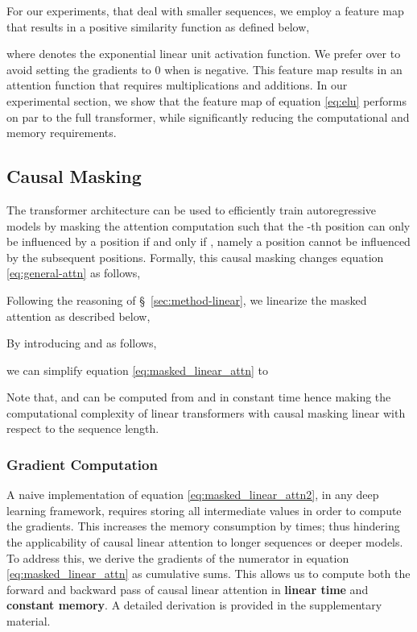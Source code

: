 \documentclass{article}
\begin{document}
For our experiments, that deal with smaller sequences, we employ a feature map
that results in a positive similarity function as defined below,

where  denotes the exponential linear unit
\cite{clevert2015fast} activation function. We prefer  over
 to avoid setting the gradients to 0 when  is negative.
This feature map results in an attention function that requires 
multiplications and additions. In our experimental section, we show that the
feature map of equation \ref{eq:elu} performs on par to the full transformer,
while significantly reducing the computational and memory requirements.

\subsection{Causal Masking} \label{sec:method-masking}

The transformer architecture can be used to efficiently train autoregressive models
by masking the attention computation such that the -th position
can only be influenced by a position  if and only if , namely a
position cannot be influenced by the subsequent positions. Formally, this
causal masking changes equation \ref{eq:general-attn} as follows,


Following the reasoning of \S~\ref{sec:method-linear}, we linearize the
masked attention as described below,

By introducing  and  as follows,

we can simplify equation \ref{eq:masked_linear_attn} to

Note that,  and  can be computed from  and  in
constant time hence making the computational complexity of linear transformers
with causal masking linear with respect to the sequence length.

\subsubsection{Gradient Computation}

A naive implementation of equation \ref{eq:masked_linear_attn2}, in any deep
learning framework, requires storing all intermediate values  in order to
compute the gradients. This increases the memory consumption by  times; thus hindering the applicability of causal linear attention to
longer sequences or deeper models. To address this, we derive the gradients of the numerator in
equation \ref{eq:masked_linear_attn} as cumulative sums. This allows us to
compute both the forward and backward pass of causal linear attention in
\textbf{linear time} and \textbf{constant memory}. A detailed derivation is
provided in the supplementary material.
\end{document}
